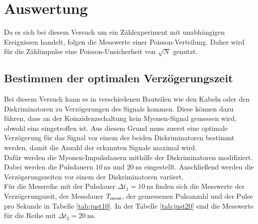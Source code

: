 \newpage 
\section{Auswertung}

\noindent
Da es sich bei diesem Versuch um ein Zählexperiment mit unabhängigen Ereignissen handelt, folgen die Messwerte einer Poisson-Verteilung. 
Daher wird für die Zählimpulse eine Poisson-Unsicherheit von $\sqrt{N}$ genutzt.

\subsection{Bestimmen der optimalen Verzögerungszeit}

\noindent
Bei diesem Versuch kann es in verschiedenen Bauteilen wie den Kabeln oder den Diskriminatoren zu Verzögerungen des Signals kommen.
Diese können dazu führen, dass an der Koinzidenzschaltung kein Myonen-Signal gemessen wird, obwohl eins eingetroffen ist.
Aus diesem Grund muss zuerst eine optimale Verzögerung für das Signal vor einem der beiden Diskriminatoren bestimmt werden, 
damit die Anzahl der erkannten Signale maximal wird.\\
Dafür werden die Myonen-Impulsdauern mithilfe der Diskriminatoren modifiziert.
Dabei werden die Pulsdauern $\SI{10}{\nano\second}$ und $\SI{20}{\nano\second}$ eingestellt.
Anschließend werden die Verzögerungszeiten vor einem der Diskriminatoren variiert. \\
Für die Messreihe mit der Pulsdauer $ \Delta t_1 = \SI{10}{\nano\second}$ finden sich die Messwerte der Verzögerungszeit, der Messdauer $T_{\text{mess}}$, der gemessenen Pulsanzahl und der Pulse pro Sekunde in Tabelle \ref{tab:just10}.
In der Tabelle \ref{tab:just20} sind die Messwerte für die Reihe mit $ \Delta t_2 =\SI{20}{\nano\second}$.


